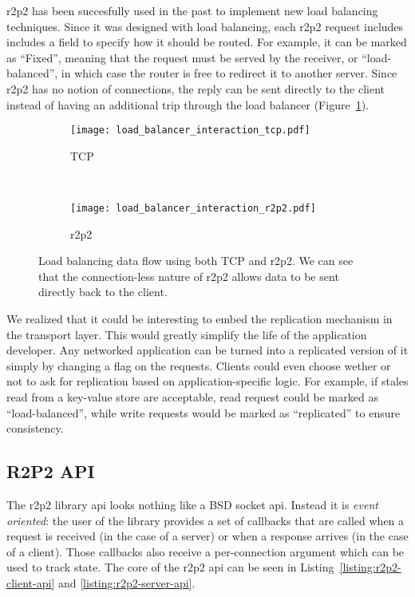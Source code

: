 \Gls{r2p2} has been succesfully used in the past to implement new load balancing techniques\cite{r2p2}.
Since it was designed with load balancing, each \gls{r2p2} request includes includes a field to specify how it should be routed.
For example, it can be marked as ``Fixed'', meaning that the request must be served by the receiver, or ``load-balanced'', in which case the router is free to redirect it to another server.
Since \gls{r2p2} has no notion of connections, the reply can be sent directly to the client instead of having an additional trip through the load balancer (Figure~\ref{fig:load_balancing}).

\begin{figure}[h!]
    \centering
    \begin{subfigure}[t]{0.4\textwidth}
        \texttt{[image: load\_balancer\_interaction\_tcp.pdf]}
        \caption{TCP}
    \end{subfigure}%
    ~
    \begin{subfigure}[t]{0.4\textwidth}
        \texttt{[image: load\_balancer\_interaction\_r2p2.pdf]}
        \caption{\gls{r2p2}}
    \end{subfigure}
    \caption{
        Load balancing data flow using both TCP and \gls{r2p2}.
        We can see that the connection-less nature of \gls{r2p2} allows data to be sent directly back to the client.
        \label{fig:load_balancing}
    }
\end{figure}


We realized that it could be interesting to embed the replication mechanism in the transport layer.
This would greatly simplify the life of the application developer.
Any networked application can be turned into a replicated version of it simply by changing a flag on the requests.
Clients could even choose wether or not to ask for replication based on application-specific logic.
For example, if stales read from a key-value store are acceptable, read request could be marked as ``load-balanced'', while write requests would be marked as ``replicated'' to ensure consistency.


\subsection{R2P2 API}

The \gls{r2p2} library \gls{api} looks nothing like a BSD socket \gls{api}.
Instead it is \emph{event oriented}: the user of the library provides a set of callbacks that are called when a request is received (in the case of a server) or when a response arrives (in the case of a client).
Those callbacks also receive a per-connection argument which can be used to track state.
The core of the \gls{r2p2} \gls{api} can be seen in Listing~\ref{listing:r2p2-client-api} and \ref{listing:r2p2-server-api}.

